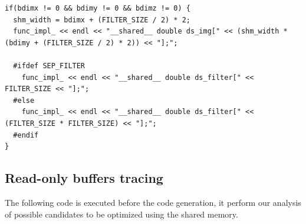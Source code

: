 \documentclass{article}
\begin{document}
\begin{verbatim}
if(bdimx != 0 && bdimy != 0 && bdimz != 0) {
  shm_width = bdimx + (FILTER_SIZE / 2) * 2;
  func_impl_ << endl << "__shared__ double ds_img[" << (shm_width * (bdimy + (FILTER_SIZE / 2) * 2)) << "];";

  #ifdef SEP_FILTER
    func_impl_ << endl << "__shared__ double ds_filter[" << FILTER_SIZE << "];";
  #else
    func_impl_ << endl << "__shared__ double ds_filter[" << (FILTER_SIZE * FILTER_SIZE) << "];";
  #endif
}
\end{verbatim}

\subsection{Read-only buffers tracing}

The following code is executed before the code generation, it perform our analysis of possible candidates to be optimized using the shared memory.
\end{document}
